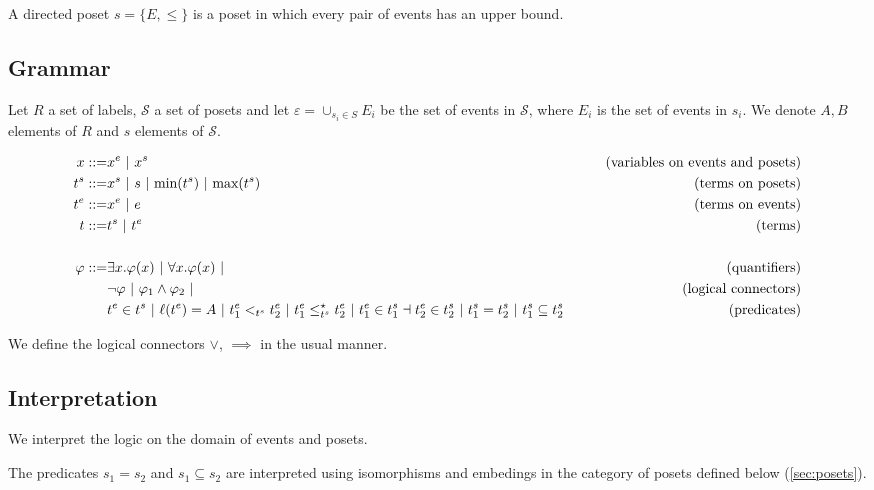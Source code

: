 \begin{definition}
  A directed poset $s=\{E,\leq\}$ is a poset in which every pair of events has an upper bound.
\end{definition}

\subsection{Grammar}

Let $R$ a set of labels, $\mathcal{S}$ a set of posets and let $\varepsilon = \cup_{s_i\in S} E_i$ be the set of events in $\mathcal{S}$, where $E_i$ is the set of events in $s_i$.
We denote $A,B$ elements of $R$ and $s$ elements of $\mathcal{S}$.

\begin{align*}
  x ::= & x^e ~|~ x^s & \tag{variables on events and posets} \\
  t^s ::= & x^s ~|~ s ~|~ \text{min}(t^s) ~|~ \text{max}(t^s) &\tag{terms on posets} \\
  t^e ::= & x^e ~|~ e & \tag{terms on events}\\
  t ::= & t^s ~|~ t^e & \tag{terms}\\
  \\
  \varphi ::= & \exists x.\varphi(x) ~|~ \forall x.\varphi(x) ~|&\tag{quantifiers}\\
  & \neg \varphi ~|~\varphi_1 \wedge \varphi_2~|&\tag{logical connectors}\\
  & t^e\in t^s ~|~ \ell(t^e) = A ~|~ t^e_1 <_{t^s} t^e_2 ~|~ t^e_1 \leq^{\star}_{t^s} t^e_2 ~|~ t^e_1\in t^s_1 \dashv t^e_2\in t^s_2~|~ t^s_1 = t^s_2 ~|~ t^s_1\subseteq t^s_2
  & \tag{predicates}\\
\end{align*}

We define the logical connectors $\vee$, $\implies$ in the usual manner.

\subsection{Interpretation}

We interpret the logic on the domain of events and posets.


The predicates $s_1 = s_2$ and $s_1\subseteq s_2$ are interpreted using isomorphisms and embedings in the category of posets defined below (\autoref{sec:posets}).

